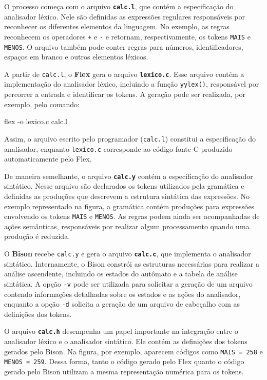 \documentclass[
  brazilian,
  letterpaper,
]{book}
\newenvironment{Shaded}{\begin{snugshade}}{\end{snugshade}}
\newcommand{\AttributeTok}[1]{\textcolor[rgb]{0.40,0.45,0.13}{#1}}
\newcommand{\FunctionTok}[1]{\textcolor[rgb]{0.28,0.35,0.67}{#1}}
\newcommand{\NormalTok}[1]{\textcolor[rgb]{0.00,0.23,0.31}{#1}}
\theoremstyle{plain}
\theoremstyle{definition}
\theoremstyle{remark}
\begin{document}
O processo começa com o arquivo \textbf{\texttt{calc.l}}, que contém a
especificação do analisador léxico. Nele são definidas as expressões
regulares responsáveis por reconhecer os diferentes elementos da
linguagem. No exemplo, as regras reconhecem os operadores \texttt{+} e
\texttt{-} e retornam, respectivamente, os tokens \texttt{MAIS} e
\texttt{MENOS}. O arquivo também pode conter regras para números,
identificadores, espaços em branco e outros elementos léxicos.

A partir de \texttt{calc.l}, o \textbf{Flex} gera o arquivo
\textbf{\texttt{lexico.c}}. Esse arquivo contém a implementação do
analisador léxico, incluindo a função \texttt{yylex()}, responsável por
percorrer a entrada e identificar os tokens. A geração pode ser
realizada, por exemplo, pelo comando:

\begin{Shaded}
\begin{Highlighting}[]
\FunctionTok{flex} \AttributeTok{{-}o}\NormalTok{ lexico.c calc.l}
\end{Highlighting}
\end{Shaded}

Assim, o arquivo escrito pelo programador (\texttt{calc.l}) constitui a
especificação do analisador, enquanto \texttt{lexico.c} corresponde ao
código-fonte C produzido automaticamente pelo Flex.

De maneira semelhante, o arquivo \textbf{\texttt{calc.y}} contém a
especificação do analisador sintático. Nesse arquivo são declarados os
tokens utilizados pela gramática e definidas as produções que descrevem
a estrutura sintática das expressões. No exemplo representado na figura,
a gramática contém produções para expressões envolvendo os tokens
\texttt{MAIS} e \texttt{MENOS}. As regras podem ainda ser acompanhadas
de ações semânticas, responsáveis por realizar algum processamento
quando uma produção é reduzida.

O \textbf{Bison} recebe \texttt{calc.y} e gera o arquivo
\textbf{\texttt{calc.c}}, que implementa o analisador sintático.
Internamente, o Bison constrói as estruturas necessárias para realizar a
análise ascendente, incluindo os estados do autômato e a tabela de
análise sintática. A opção \texttt{-v} pode ser utilizada para solicitar
a geração de um arquivo contendo informações detalhadas sobre os estados
e as ações do analisador, enquanto a opção \texttt{-d} solicita a
geração de um arquivo de cabeçalho com as definições dos tokens.

O arquivo \textbf{\texttt{calc.h}} desempenha um papel importante na
integração entre o analisador léxico e o analisador sintático. Ele
contém as definições dos tokens gerados pelo Bison. Na figura, por
exemplo, aparecem códigos como \texttt{MAIS\ =\ 258} e
\texttt{MENOS\ =\ 259}. Dessa forma, tanto o código gerado pelo Flex
quanto o código gerado pelo Bison utilizam a mesma representação
numérica para os tokens.
\end{document}
